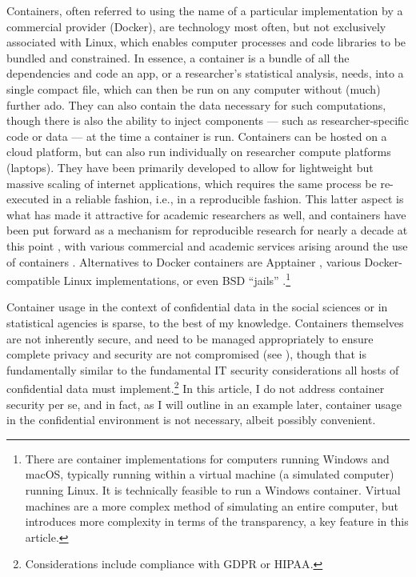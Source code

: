 \documentclass[]{hdsr}
\begin{document}
Containers, often referred to using the name of a particular implementation by a commercial provider (Docker), are technology most often, but not exclusively associated with Linux, which enables computer processes and code libraries to be bundled and constrained. In essence, a container is a bundle of all the dependencies and code an app, or a researcher's statistical analysis, needs, into a single compact file, which can then be run on any computer without (much) further ado. They can also contain the data necessary for such computations, though there is also the ability to inject components --- such as researcher-specific code or data --- at the time a container is run. Containers can be hosted on a cloud platform, but can also run individually on researcher compute platforms (laptops).  They have been primarily developed to allow for lightweight but massive scaling of internet applications, which requires the same process be re-executed in a reliable fashion, i.e., in a reproducible fashion. This latter aspect is what has made it attractive for academic researchers as well, and containers have been put forward as a mechanism for reproducible research for nearly a decade at this point \citep{boettiger_introduction_2015}, with various commercial and academic services arising around the use of containers \citep{clyburne-sherin_computational_2019,chard_toward_2020,brinckman_computing_2018}. Alternatives to Docker containers are Apptainer \citep{contributors_to_the_apptainer_project_apptainer_2025}, various Docker-compatible Linux implementations, or even BSD ``jails'' \citep{the_freebsd_project_chapter_2025}.\footnote{There are container implementations for computers running Windows and macOS, typically running within a virtual machine (a simulated computer) running Linux. It is technically feasible to run a Windows container. Virtual machines are a more complex method of simulating an entire computer, but introduces more complexity in terms of the transparency, a key feature in this article.} 

Container usage in the context of confidential data in the social sciences or in statistical agencies is sparse, to the best of my knowledge. Containers themselves are not inherently secure, and need to be managed appropriately to ensure complete privacy and security are not compromised (see \citep{souppaya_application_2017}), though that is fundamentally similar to the fundamental IT security considerations all hosts of confidential data must implement.\footnote{Considerations include compliance with \ac{GDPR} or \ac{HIPAA}.} In this article, I do not address container security per se, and in fact, as I will outline in an example later, container usage in the confidential environment is not necessary, albeit possibly convenient.  
\end{document}
